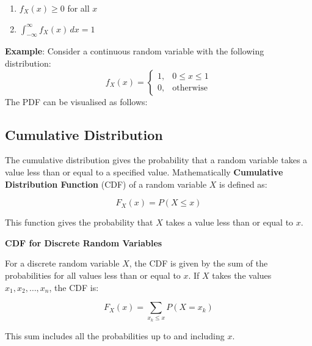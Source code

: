 \documentclass[twoside]{book}
\begin{document}
\begin{enumerate}
    \item \( f_X(x) \geq 0 \) for all \( x \)
    \item \( \int_{-\infty}^{\infty} f_X(x) \, dx = 1 \)
\end{enumerate}

\textbf{Example}: Consider a continuous random variable with the following distribution:
\[
f_X(x) =
\begin{cases}
1, & 0 \leq x \leq 1 \\
0, & \text{otherwise}
\end{cases}
\]
The PDF can be visualised as follows:


\begin{center}
\end{center}

\subsection{Cumulative Distribution}

The cumulative distribution gives the probability that a random variable takes a value less than or equal to a specified value. Mathematically \textbf{Cumulative Distribution Function} (CDF) of a random variable \( X \) is defined as:
\begin{textbox}
    \[
F_X(x) = P(X \leq x)
\]
\end{textbox}
This function gives the probability that \( X \) takes a value less than or equal to \( x \).

\textbf{CDF for Discrete Random Variables}

For a discrete random variable \( X \), the CDF is given by the sum of the probabilities for all values less than or equal to \( x \). If \( X \) takes the values \( x_1, x_2, \dots, x_n \), the CDF is:
\begin{textbox}
\[
F_X(x) = \sum_{x_k \leq x} P(X = x_k)
\]
\end{textbox}
This sum includes all the probabilities up to and including \( x \).
\end{document}
